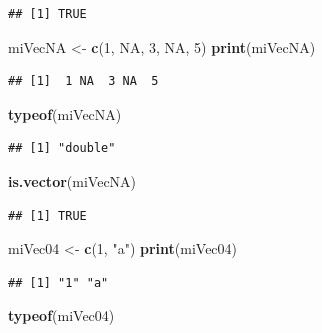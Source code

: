 \documentclass[]{book}
\newenvironment{Shaded}{\begin{snugshade}}{\end{snugshade}}
\newcommand{\KeywordTok}[1]{\textcolor[rgb]{0.13,0.29,0.53}{\textbf{#1}}}
\newcommand{\DecValTok}[1]{\textcolor[rgb]{0.00,0.00,0.81}{#1}}
\newcommand{\StringTok}[1]{\textcolor[rgb]{0.31,0.60,0.02}{#1}}
\newcommand{\OtherTok}[1]{\textcolor[rgb]{0.56,0.35,0.01}{#1}}
\newcommand{\NormalTok}[1]{#1}
\begin{document}
\begin{verbatim}
## [1] TRUE
\end{verbatim}

\begin{Shaded}
\begin{Highlighting}[]
\NormalTok{miVecNA <-}\StringTok{ }\KeywordTok{c}\NormalTok{(}\DecValTok{1}\NormalTok{, }\OtherTok{NA}\NormalTok{, }\DecValTok{3}\NormalTok{, }\OtherTok{NA}\NormalTok{, }\DecValTok{5}\NormalTok{)}
\KeywordTok{print}\NormalTok{(miVecNA)}
\end{Highlighting}
\end{Shaded}

\begin{verbatim}
## [1]  1 NA  3 NA  5
\end{verbatim}

\begin{Shaded}
\begin{Highlighting}[]
\KeywordTok{typeof}\NormalTok{(miVecNA)}
\end{Highlighting}
\end{Shaded}

\begin{verbatim}
## [1] "double"
\end{verbatim}

\begin{Shaded}
\begin{Highlighting}[]
\KeywordTok{is.vector}\NormalTok{(miVecNA)}
\end{Highlighting}
\end{Shaded}

\begin{verbatim}
## [1] TRUE
\end{verbatim}

\begin{Shaded}
\begin{Highlighting}[]
\NormalTok{miVec04 <-}\StringTok{ }\KeywordTok{c}\NormalTok{(}\DecValTok{1}\NormalTok{, }\StringTok{"a"}\NormalTok{)}
\KeywordTok{print}\NormalTok{(miVec04)}
\end{Highlighting}
\end{Shaded}

\begin{verbatim}
## [1] "1" "a"
\end{verbatim}

\begin{Shaded}
\begin{Highlighting}[]
\KeywordTok{typeof}\NormalTok{(miVec04)}
\end{Highlighting}
\end{Shaded}
\end{document}
